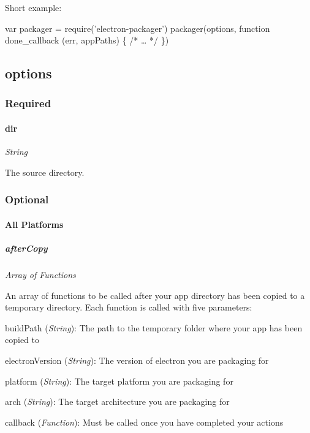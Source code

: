 Short example\+:


\begin{DoxyCode}
var packager = require('electron-packager')
packager(options, function done\_callback (err, appPaths) \{ /* … */ \})
\end{DoxyCode}


\subsection*{{\ttfamily options}}

\subsubsection*{Required}

\paragraph*{{\ttfamily dir}}

{\itshape String}

The source directory.

\subsubsection*{Optional}

\paragraph*{All Platforms}

\subparagraph*{{\ttfamily after\+Copy}}

{\itshape Array of Functions}

An array of functions to be called after your app directory has been copied to a temporary directory. Each function is called with five parameters\+:


\begin{DoxyItemize}
\item {\ttfamily build\+Path} ({\itshape String})\+: The path to the temporary folder where your app has been copied to
\item {\ttfamily electron\+Version} ({\itshape String})\+: The version of electron you are packaging for
\item {\ttfamily platform} ({\itshape String})\+: The target platform you are packaging for
\item {\ttfamily arch} ({\itshape String})\+: The target architecture you are packaging for
\item {\ttfamily callback} ({\itshape Function})\+: Must be called once you have completed your actions
\end{DoxyItemize}

